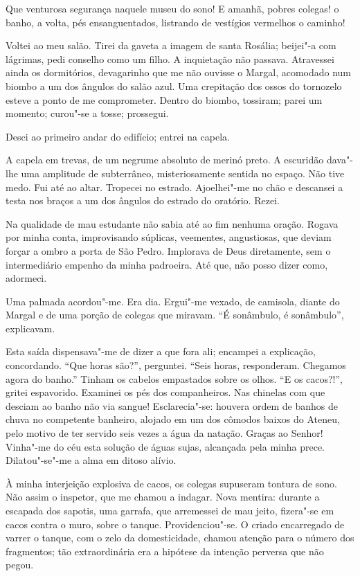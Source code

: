 Que venturosa segurança naquele museu do
sono! E amanhã, pobres colegas! o banho, a volta, pés ensanguentados,
listrando de vestígios vermelhos o caminho! 


\indent Voltei ao meu salão. Tirei
da gaveta a imagem de santa Rosália; beijei"-a com lágrimas, pedi
conselho como um filho. A inquietação não passava. Atravessei ainda os
dormitórios, devagarinho que me não ouvisse o Margal, acomodado num
biombo a um dos ângulos do salão azul. Uma crepitação dos ossos do
tornozelo esteve a ponto de me comprometer. Dentro do biombo, tossiram;
parei um momento; curou"-se a tosse; prossegui. 

Desci ao primeiro andar do edifício; entrei na capela. 

A capela em trevas, de um negrume
absoluto de merinó preto. A escuridão dava"-lhe uma amplitude de
subterrâneo, misteriosamente sentida no espaço. Não tive medo. Fui até
ao altar. Tropecei no estrado. Ajoelhei"-me no chão e descansei a
testa nos braços a um dos ângulos do estrado do oratório. Rezei. 

Na qualidade de mau estudante não sabia até ao fim nenhuma oração. Rogava
por minha conta, improvisando súplicas, veementes, angustiosas, 
que deviam forçar a ombro a porta de São Pedro. Implorava de Deus diretamente, sem o
intermediário empenho da minha padroeira. Até que, não posso dizer
como, adormeci. 

Uma palmada acordou"-me. Era dia. Ergui"-me vexado,
de camisola, diante do Margal e de uma porção de colegas que miravam.
``É sonâmbulo, é sonâmbulo'', explicavam. 

Esta saída dispensava"-me de
dizer a que fora ali; encampei a explicação, concordando. ``Que horas
são?'', perguntei. ``Seis horas, responderam. Chegamos agora do banho.''
Tinham os cabelos empastados sobre os olhos. ``E os cacos?!'', gritei
espavorido. Examinei os pés dos companheiros. Nas chinelas com que
desciam ao banho não via sangue! Esclarecia"-se: houvera ordem de
banhos de chuva no competente banheiro, alojado em um dos cômodos
baixos do Ateneu, pelo motivo de ter servido seis vezes a água da
natação. Graças ao Senhor! Vinha"-me do céu esta solução de águas
sujas, alcançada pela minha prece. Dilatou"-se"-me a alma em ditoso alívio. 

À minha interjeição explosiva de cacos, os colegas supuseram
tontura de sono. Não assim o inspetor, que me chamou a indagar. Nova
mentira: durante a escapada dos sapotis, uma garrafa, que arremessei de
mau jeito, fizera"-se em cacos contra o muro, sobre o tanque.
Providenciou"-se. O criado encarregado de varrer o tanque, com o zelo
da domesticidade, chamou atenção para o número dos fragmentos; tão
extraordinária era a hipótese da intenção perversa que não pegou. 

